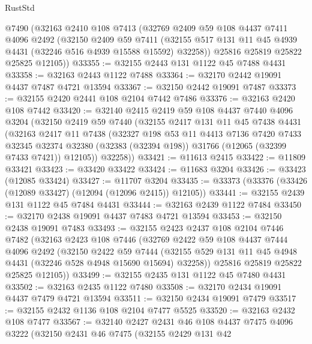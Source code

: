 \begin{lexlean}{RustStd}
\begin{coremodule}
    @7490
    (@32163
      @2410
      @108
      @7413
      (@32769
        @2409
        @59
        @108
        @4437
        @7411
        @4096
        @2492
        (@32150
          @2409
          @59
          @7411
          (@32155 @517 @131 @11 @45 @4939 @4431 (@32246 @516 @4939 @15588 @15592) @32258))
        @25816
        @25819
        @25822
        @25825
        @12105))
@33355 := @32155 @2443 @131 @1122 @45 @7488 @4431
@33358 := @32163 @2443 @1122 @7488
@33364 := @32170 @2442 @19091 @4437 @7487 @4721 @13594
@33367 := @32150 @2442 @19091 @7487
@33373 := @32155 @2420 @2441 @108 @2104 @7442 @7486
@33376 := @32163 @2420 @108 @7442
@33420 := @32140
    @2415
    @2419
    @59
    @108
    @4437
    @7440
    @4096
    @3204
    (@32150
      @2419
      @59
      @7440
      (@32155
        @2417
        @131
        @11
        @45
        @7438
        @4431
        (@32163
          @2417
          @11
          @7438
          (@32327
            @198
            @53
            @11
            @4413
            @7136
            @7420
            @7433
            @32345
            @32374
            @32380
            (@32383 (@32394 @198))
            @31766
            (@12065 (@32399 @7433 @7421))
            @12105))
        @32258))
@33421 := @11613 @2415
@33422 := @11809 @33421
@33423 := @33420 @33422
@33424 := @11683 @3204
@33426 := @33423 (@12085 @33424)
@33427 := @11707 @3204
@33435 := @33373 (@33376 (@33426 (@12089 @33427) (@12094 (@12096 @2415)) @12105))
@33441 := @32155 @2439 @131 @1122 @45 @7484 @4431
@33444 := @32163 @2439 @1122 @7484
@33450 := @32170 @2438 @19091 @4437 @7483 @4721 @13594
@33453 := @32150 @2438 @19091 @7483
@33493 := @32155
    @2423
    @2437
    @108
    @2104
    @7446
    @7482
    (@32163
      @2423
      @108
      @7446
      (@32769
        @2422
        @59
        @108
        @4437
        @7444
        @4096
        @2492
        (@32150
          @2422
          @59
          @7444
          (@32155 @529 @131 @11 @45 @4948 @4431 (@32246 @528 @4948 @15690 @15694) @32258))
        @25816
        @25819
        @25822
        @25825
        @12105))
@33499 := @32155 @2435 @131 @1122 @45 @7480 @4431
@33502 := @32163 @2435 @1122 @7480
@33508 := @32170 @2434 @19091 @4437 @7479 @4721 @13594
@33511 := @32150 @2434 @19091 @7479
@33517 := @32155 @2432 @1136 @108 @2104 @7477 @5525
@33520 := @32163 @2432 @108 @7477
@33567 := @32140
    @2427
    @2431
    @46
    @108
    @4437
    @7475
    @4096
    @3222
    (@32150
      @2431
      @46
      @7475
      (@32155
        @2429
        @131
        @42

\end{coremodule}
\end{lexlean}
